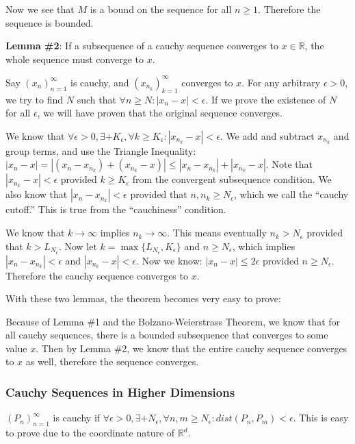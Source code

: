 Now we see that $M$ is a bound on the sequence for all $n \geq 1$. Therefore the
sequence is bounded.

\textbf{Lemma \#2}: If a subsequence of a cauchy sequence converges to $x \in \mathbb{R}$, the
whole sequence must converge to $x$.

Say $(x_n)_{n=1}^\infty$ is cauchy, and $(x_{n_k})_{k = 1}^\infty$ converges to
$x$. For any arbitrary $\epsilon > 0$, we try to find $N$ such that $\forall
n \geq N: |x_n - x| < \epsilon$. If we prove the existence of $N$ for all
$\epsilon$, we will have proven that the original sequence converges.

We know that $\forall \epsilon > 0, \exists + K_\epsilon, \forall k \geq
K_\epsilon: |x_{n_k} - x| < \epsilon$. We add and subtract $x_{n_k}$ and
group terms, and use the Triangle Inequality: $|x_n - x| = |(x_n - x_{n_k}) + (x_{n_k} - x)| \leq
|x_n - x_{n_k}| + |x_{n_k} - x|$. Note that $|x_{n_k} - x| < \epsilon$
provided $k \geq K_{\epsilon}$ from the convergent subsequence condition. We
also know that $|x_n - x_{n_k}| < \epsilon$ provided that $n, n_k \geq
N_{\epsilon}$, which we call the ``cauchy cutoff.'' This is true from the
``cauchiness'' condition.

We know that $k\to\infty$ implies $n_k \to \infty$. This means eventually
$n_k > N_\epsilon$ provided that $k > L_{N_\epsilon}$. Now let $k =
\max\{L_{N_\epsilon}, K_\epsilon\}$ and $n \geq N_\epsilon$, which
implies $|x_n - x_{n_k}| < \epsilon$ and $|x_{n_k} - x| < \epsilon$.
Now we know: $|x_n - x| \leq 2\epsilon$ provided $n \geq N_{\epsilon}$.
Therefore the cauchy sequence converges to $x$.

\vspace{0.3cm}

With these two lemmas, the theorem becomes very easy to prove:

Because of Lemma \#1 and the Bolzano-Weierstrass Theorem, we know that for all
cauchy sequences, there is a bounded subsequence that converges to some value
$x$. Then by Lemma \#2, we know that the entire cauchy sequence converges to $x$
as well, therefore the sequence converges. 

\subsubsection{Cauchy Sequences in Higher Dimensions}

$(P_n)_{n=1}^\infty$ is cauchy if $\forall \epsilon > 0, \exists +
N_\epsilon, \forall n, m \geq N_\epsilon: dist(P_n, P_m) < \epsilon$.
This is easy to prove due to the coordinate nature of $\mathbb{R}^d$.


